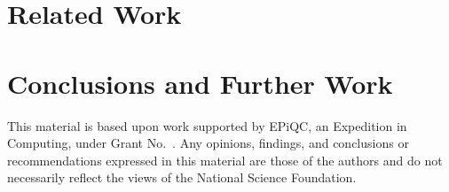 \documentclass[acmsmall,nonacm,review,timestamp]{acmart}
\begin{document}
\section{Related Work}

\section{Conclusions and Further Work}

\listofnotes


\begin{acks}                            %
  This material is based upon work supported by
  EPiQC, an 
  Expedition in Computing, under Grant
  No.~.  Any opinions, findings, and
  conclusions or recommendations expressed in this material are those
  of the authors and do not necessarily reflect the views of the
  National Science Foundation.
\end{acks}




\end{document}
